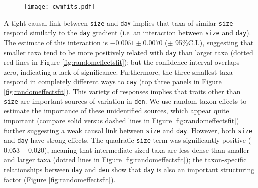 \documentclass[12pt]{ecology}
\begin{document}
\begin{figure}
\caption[The relationship between community-weighted mean body length and day-of-year, with the fitted values of three models (Eqs. \ref{eq:sdm}, \ref{eq:fdmnointeraction}, \ref{eq:fdminteraction}).]{}%
\texttt{[image: cwmfits.pdf]}
\label{fig:cwmfits}
\end{figure}

A tight causal link between \texttt{size} and \texttt{day} implies that taxa of similar \texttt{size} respond similarly to the \texttt{day} gradient (i.e. an interaction between \texttt{size} and \texttt{day}).  The estimate of this interaction is $-0.0051 \pm 0.0070$ ($\pm$ 95\%C.I.), suggesting that smaller taxa tend to be more positively related with \texttt{day} than larger taxa (dotted red lines in Figure \ref{fig:randomeffectsfit}); but the confidence interval overlaps zero, indicating a lack of significance.  Furthermore, the three smallest taxa respond in completely different ways to \texttt{day} (top three panels in Figure \ref{fig:randomeffectsfit}).  This variety of responses implies that traits other than \texttt{size} are important sources of variation in \texttt{den}.  We use random taxon effects to estimate the importance of these unidentified sources, which appear quite important (compare solid versus dashed lines in Figure \ref{fig:randomeffectsfit}) further suggesting a weak causal link between \texttt{size} and \texttt{day}.  However, both \texttt{size} and \texttt{day} have strong effects.  The quadratic \texttt{size} term was significantly positive ($0.053 \pm 0.020$), meaning that intermediate sized taxa are less dense than smaller and larger taxa (dotted lines in Figure \ref{fig:randomeffectsfit}); the taxon-specific relationships between \texttt{day} and \texttt{den} show that \texttt{day} is also an important structuring factor (Figure \ref{fig:randomeffectsfit}).




\end{document}

